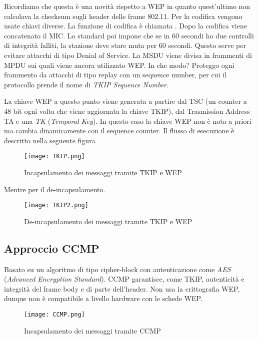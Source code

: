 \documentclass[14pt]{extreport}
\begin{document}
Ricordiamo che questa è una novità rispetto a WEP in quanto quest'ultimo non calcolava la checksum sugli header delle frame 802.11.
Per la codifica vengono usate chiavi diverse. La funzione di codifica è chiamata . Dopo la codifica viene concatenato il MIC.
Lo standard poi impone che se in 60 secondi ho due controlli di integrità falliti, la stazione deve stare muta per 60 secondi. Questo serve per evitare attacchi di tipo Denial of Service.
La MSDU viene divisa in frammenti di MPDU sui quali viene ancora utilizzato WEP. In che modo? Proteggo ogni frammento da attacchi di tipo replay con un sequence number, per cui il protocollo prende il nome di \textit{TKIP Sequence Number}.

La chiave WEP a questo punto viene generata a partire dal TSC (un counter a 48 bit ogni volta che viene aggiornata la chiave TKIP), dal Trasmission Address TA e una \textit{TK} (\textit{Temporal Key}). In questo caso la chiave WEP non è nota a priori ma cambia dinamicamente con il sequence counter. Il flusso di esecuzione è descritto nella seguente figura




\begin{figure}[H]
    \centering
    \texttt{[image: TKIP.png]}
    \caption{Incapsulamento dei messaggi tramite TKIP e WEP}
    \label{TKIP}
\end{figure}

Mentre per il de-incapsulamento.

\begin{figure}[H]
    \centering
    \texttt{[image: TKIP2.png]}
    \caption{De-incapsulamento dei messaggi tramite TKIP e WEP}
    \label{TKIP2}
\end{figure}

\subsection{Approccio CCMP}
Basato su un algoritmo di tipo cipher-block con autenticazione come \textit{AES} (\textit{Advanced Encryption Standard}).
CCMP garantisce, come TKIP, autenticità e integrità del frame body e di parte dell'header. Non usa la crittografia WEP, dunque non è compatibile a livello hardware con le schede WEP. 


\begin{figure}[H]
    \centering
    \texttt{[image: CCMP.png]}
    \caption{Incapsulamento dei messaggi tramite CCMP}
    \label{CCMP}
\end{figure}
\end{document}

